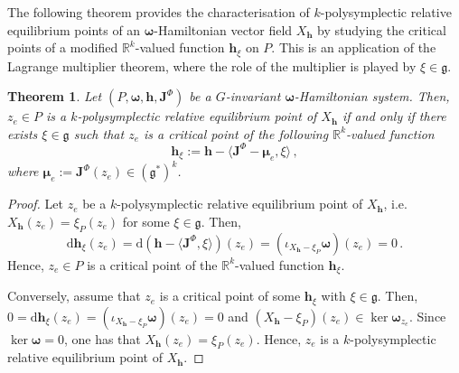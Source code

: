 \documentclass[11pt]{article}
\theoremstyle{plain}
\newtheorem{theorem}{Theorem}[section]
\theoremstyle{definition}
\newcommand{\bomega}{{\boldsymbol{\omega}}}
\newcommand{\bh}{{\boldsymbol{h}}}
\renewcommand{\d}{\mathrm{d}}
\newcommand*{\inn}[1]{\iota_{#1}}
\newcommand{\Lg}{\mathfrak{g}}
\def\d{\mathrm{d}}
\numberwithin{equation}{section}
\begin{document}
The following theorem provides the characterisation of $k$-polysymplectic relative equilibrium points of an $\bomega$-Hamiltonian vector field $X_\bh$ by studying the critical points of a modified $\mathbb{R}^k$-valued function $\boldsymbol{h}_\xi$ on $P$. This is an application of the Lagrange multiplier theorem, where the role of the multiplier is played by $\xi\in\Lg$. %

\begin{theorem}
\label{Th::ksymEM}
    Let $(P,\boldsymbol{\omega},\boldsymbol{h},\mathbf{J}^\Phi)$ be a $G$-invariant $\bomega$-Hamiltonian system. Then, $z_e\in P$ is a $k$-polysymplectic relative equilibrium point of $X_{\boldsymbol{h}}$ if and only if there exists $\xi\in\mathfrak{g}$ such that $z_e$ is a critical point of the following $\mathbb{R}^k$-valued function
    \begin{equation}
    \label{Eq::EMfunction}
    \boldsymbol{h}_\xi:=\boldsymbol{h}-\langle \mathbf{J}^\Phi-\boldsymbol{\mu}_e,\xi \rangle \,,
    \end{equation}
    where $\boldsymbol{\mu}_e:=\mathbf{J}^\Phi(z_e)\in(\mathfrak{g}^*)^k$.
\end{theorem}
\begin{proof}
    Let $z_e$ be a $k$-polysymplectic relative equilibrium point of $X_{\boldsymbol{h}}$, i.e. $X_{\boldsymbol{h}}(z_e)=\xi_P(z_e)$ for some $\xi\in\Lg$. Then,
    \begin{equation}
    \label{Eq::kEMproof}
    \d\boldsymbol{h}_{\xi}(z_e)=\d(\boldsymbol{h}-\langle \mathbf{J}^\Phi,\xi\rangle )(z_e)=(\inn{X_{\bm h}-\xi_{P}}\bomega)(z_e) = 0\,.
    \end{equation}
    Hence, $z_e\in P$ is a critical point of the $\mathbb{R}^k$-valued function $\boldsymbol{h}_\xi$. 

    Conversely, assume that $z_e$ is a critical point of some $\boldsymbol{h}_\xi$ with $\xi\in\mathfrak{g}$. Then,
    $0=\d \boldsymbol{h}_\xi(z_e)=(\iota_{X_\bh-\xi_P}\boldsymbol{\omega})(z_e)=0$
    and $(X_\bh-\xi_P)(z_e)\in \ker\boldsymbol{\omega}_{z_e}$. Since $\ker\boldsymbol{\omega}=0$, one has that $X_\bh(z_e)=\xi_P(z_e)$. Hence, $z_e$ is a $k$-polysymplectic relative equilibrium point of $X_\bh$.
\end{proof}
\end{document}
